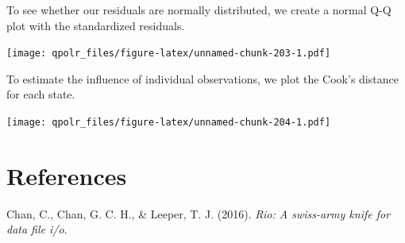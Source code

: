 \documentclass[12pt,oneside]{reedthesis}
\theoremstyle{definition}
\theoremstyle{definition}
\theoremstyle{definition}
\theoremstyle{remark}
\begin{document}
  To see whether our residuals are normally distributed, we create a
  normal Q-Q plot with the standardized residuals.
  \begin{Shaded}
  \begin{Highlighting}[]
  \OperatorTok{+}
  \StringTok{  }\NormalTok{(}\NormalTok{(}\OperatorTok{+}
  \StringTok{  }\NormalTok{() }\OperatorTok{+}
  \StringTok{  }\NormalTok{(} \NormalTok{,}
          \NormalTok{,}
          \NormalTok{)}
  \end{Highlighting}
  \end{Shaded}
  \texttt{[image: qpolr\_files/figure-latex/unnamed-chunk-203-1.pdf]}
  
  To estimate the influence of individual observations, we plot the Cook's
  distance for each state.
  \begin{Shaded}
  \begin{Highlighting}[]
  \NormalTok{(} \OperatorTok{+}
  \StringTok{  }\NormalTok{()  }\OperatorTok{+}
  \StringTok{  }\NormalTok{(} \NormalTok{,}
          \NormalTok{,}
          \NormalTok{)}
  \end{Highlighting}
  \end{Shaded}
  \texttt{[image: qpolr\_files/figure-latex/unnamed-chunk-204-1.pdf]}
  
  \backmatter
  
  \chapter{References}\label{references}
  
  \noindent
  
  \setlength{\parindent}{-0.20in} \setlength{\leftskip}{0.20in}
  \setlength{\parskip}{8pt}
  
  \hypertarget{refs}{}
  \hypertarget{ref-chanetal2016}{}
  Chan, C., Chan, G. C. H., \& Leeper, T. J. (2016). \emph{Rio: A
  swiss-army knife for data file i/o}.
  
\end{document}
